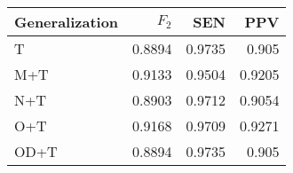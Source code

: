 \begin{table}[htbp]
  \caption{}
  \label{tab:}
  \centering
  \begin{tabular}[h]{@{}lrrr@{}}
    \toprule
    Generalization & \(F_2\) & SEN & PPV \\
    \midrule
T	&	0.8894	&	0.9735	&	0.905 \\
M+T	&	0.9133	&	0.9504	&	0.9205 \\
N+T	&	0.8903	&	0.9712	&	0.9054 \\
O+T	&	0.9168	&	0.9709	&	0.9271 \\
OD+T	&	0.8894	&	0.9735	&	0.905 \\
    \bottomrule
  \end{tabular}
\end{table}
